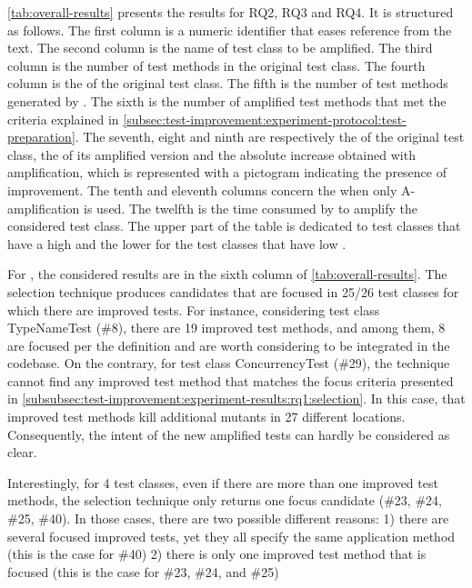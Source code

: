 \autoref{tab:overall-results}
presents the results for RQ2, RQ3 and RQ4.%
It is structured as follows.
The first column is a numeric identifier that eases reference from the text.
The second column is the name of test class to be amplified.
The third column is the number of test methods in the original test class.
The fourth column is the \ms of the original test class.
The fifth is the number of test methods generated by \dspot.
The sixth is the number of amplified test methods that met the criteria explained in \autoref{subsec:test-improvement:experiment-protocol:test-preparation}.
The seventh, eight and ninth are respectively the \ams of the original test class, the \ams of its amplified version and the absolute increase obtained with amplification, which is represented with a pictogram indicating the presence of improvement. 
The tenth and eleventh columns concern the \ams when only A-amplification is used.
The twelfth is the time consumed by \dspot to amplify the considered test class. 
The upper part of the table is dedicated to test classes that have a high \ms and the lower for the test classes that have low \ms.

For \rqcandidates{}, the considered results are in the sixth column of \autoref{tab:overall-results}.
The selection technique produces candidates that are focused in 25/26 test classes for which there are improved tests.
For instance, considering test class TypeNameTest (\#8), there are 19 improved test methods, and among them, 8 are focused per the definition and are worth considering to be integrated in the codebase.
On the contrary, for test class ConcurrencyTest (\#29), the technique cannot find any improved test method that matches the focus criteria presented in \autoref{subsubsec:test-improvement:experiment-results:rq1:selection}. 
In this case, that improved test methods kill additional mutants in 27 different locations. 
Consequently, the intent of the new amplified tests can  hardly be considered as clear.

Interestingly, for 4 test classes, even if there are more than one improved test methods, the selection technique only returns one focus candidate (\#23, \#24, \#25, \#40). 
In those cases, there are two possible different reasons:
1) there are several focused improved tests, yet they all specify the same application method (this is the case for \#40)
2) there is only one improved test method that is focused (this is the case for \#23, \#24, and \#25)


